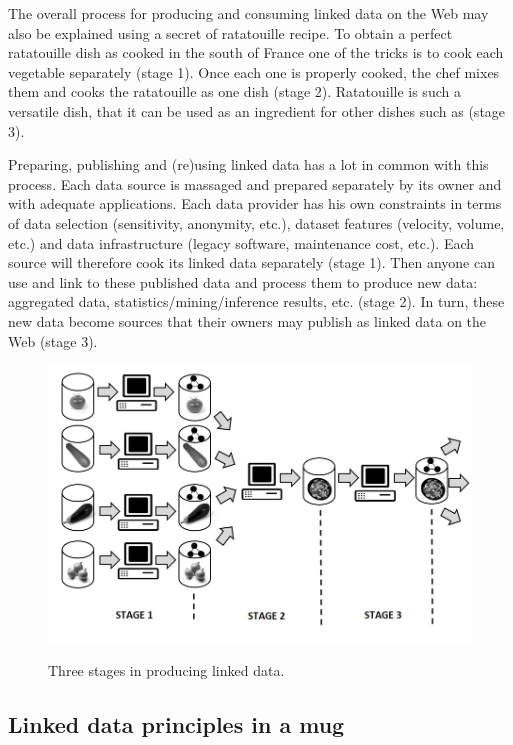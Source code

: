 The overall process for producing and consuming linked data on the Web
may also be explained using a secret of ratatouille recipe. To obtain a
perfect ratatouille dish as cooked in the south of France one of the
tricks is to cook each vegetable separately (stage 1). Once each one is
properly cooked, the chef mixes them and cooks the ratatouille as one
dish (stage 2). Ratatouille is such a versatile dish, that it can be
used as an ingredient for other dishes such as (stage 3).

Preparing, publishing and (re)using linked data has a lot in common with
this process. Each data source is massaged and prepared separately by
its owner and with adequate applications. Each data provider has his own
constraints in terms of data selection (sensitivity, anonymity, etc.),
dataset features (velocity, volume, etc.) and data infrastructure
(legacy software, maintenance cost, etc.). Each source will therefore
cook its linked data separately (stage 1). Then anyone can use and link
to these published data and process them to produce new data: aggregated
data, statistics/mining/inference results, etc. (stage 2). In turn,
these new data become sources that their owners may publish as linked
data on the Web (stage 3).

\begin{figure}

\includegraphics[width=5in]{media/ch5/figure-05-13x}
\label{fig:ch5.13x}
\caption{Three stages in producing linked data.}
\end{figure}

\hypertarget{linked-data-principles-in-a-mug}{%
\subsection{Linked data principles in a
mug}\label{linked-data-principles-in-a-mug}}

